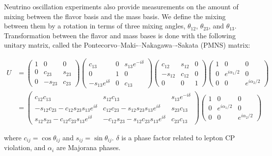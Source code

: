 Neutrino oscillation experiments also provide measurements on the amount of mixing between the flavor basis and the mass basis.  We define the mixing between them by a rotation in terms of three mixing angles, $\theta_{12}$, $\theta_{23}$, and $\theta_{13}$.  Transformation between the flavor and mass bases is done with the following unitary matrix, called the Pontecorvo--Maki-–Nakagawa–-Sakata (PMNS) matrix:

\begin{equation}
\begin{aligned}
U &= \begin{pmatrix}
1 & 0 & 0 \\
0 & c_{23} & s_{23} \\
0 & -s_{23} & c_{23} \end{pmatrix}
\begin{pmatrix}
c_{13} & 0 & s_{13} e^{-i \delta} \\
0 & 1 & 0 \\
-s_{13} e^{i \delta} & 0 & c_{13} \end{pmatrix}
\begin{pmatrix}
c_{12} & s_{12} & 0 \\
-s_{12} & c_{12} & 0 \\
0 & 0 & 1 \end{pmatrix}
\begin{pmatrix}
1 & 0 & 0 \\
0 & e^{i \alpha_{1}/2} & 0 \\
0 & 0 & e^{i \alpha_{2}/2} \end{pmatrix} \\
& = \begin{pmatrix}
c_{12} c_{13} & s_{12} c_{13} & s_{13} e^{-i \delta} \\
-s_{12} c_{23} - c_{12} s_{23} s_{13} e^{i \delta} & c_{12} c_{23} - s_{12} s_{23} s_{13} e^{i \delta} & s_{23} c_{13} \\
s_{12} s_{23} - c_{12} c_{23} s_{13} e^{i \delta} & -c_{12} s_{23} - s_{12} c_{23} s_{13} e^{i \delta} & c_{23} c_{13} \end{pmatrix}
\begin{pmatrix}
1 & 0 & 0 \\
0 & e^{i \alpha_{1}/2} & 0 \\
0 & 0 & e^{i \alpha_{2}/2} \end{pmatrix}
\end{aligned}
\label{eqn:umatrix}
\end{equation}

\noindent
where $c_{ij} = \cos \theta_{ij}$ and $s_{ij} = \sin \theta_{ij}$.  $\delta$ is a phase factor related to lepton CP violation, and $\alpha_{i}$ are Majorana phases.


